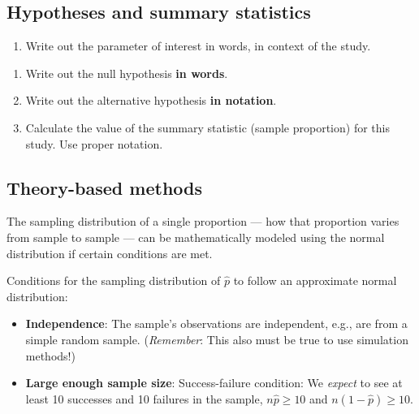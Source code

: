\documentclass[
]{report}
\providecommand{\tightlist}{%
  \setlength{\itemsep}{0pt}\setlength{\parskip}{0pt}}
\begin{document}
\vspace{0.2in}

\subsection*{Hypotheses and summary statistics}\label{hypotheses-and-summary-statistics}

\begin{enumerate}
\def\labelenumi{\arabic{enumi}.}
\setcounter{enumi}{1}
\tightlist
\item
  Write out the parameter of interest in words, in context of the study.
\end{enumerate}

\vspace{1in}

\begin{enumerate}
\def\labelenumi{\arabic{enumi}.}
\setcounter{enumi}{2}
\item
  Write out the null hypothesis \textbf{in words}.
  \vspace{1in}
\item
  Write out the alternative hypothesis \textbf{in notation}.
  \vspace{0.4in}
\item
  Calculate the value of the summary statistic (sample proportion) for this study. Use proper notation.
\end{enumerate}

\vspace{0.3in}

\newpage

\subsection*{Theory-based methods}\label{theory-based-methods}

The sampling distribution of a single proportion --- how that proportion varies from sample to sample --- can be mathematically modeled using the normal distribution if certain conditions are met.

Conditions for the sampling distribution of \(\hat{p}\) to follow an approximate normal distribution:

\begin{itemize}
\item
  \textbf{Independence}: The sample's observations are independent, e.g., are from a simple random sample. (\emph{Remember}: This also must be true to use simulation methods!)
\item
  \textbf{Large enough sample size}: Success-failure condition: We \emph{expect} to see at least 10 successes and 10 failures in the sample, \(n\hat{p}≥10\) and \(n(1-\hat{p})≥10\).
\end{itemize}
\end{document}
